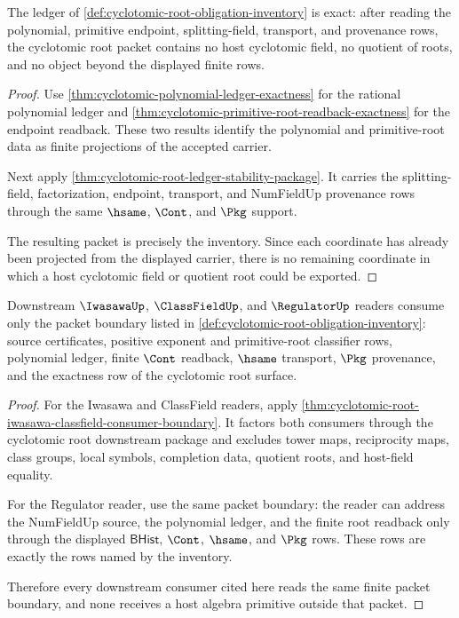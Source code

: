 \begin{theorem}
\label{thm:cyclotomic-root-ledger-exactness-obligation}
The ledger of \autoref{def:cyclotomic-root-obligation-inventory} is exact:
after reading the polynomial, primitive endpoint, splitting-field, transport,
and provenance rows, the cyclotomic root packet contains no host cyclotomic
field, no quotient of roots, and no object beyond the displayed finite rows.
\end{theorem}
\begin{proof}
Use \autoref{thm:cyclotomic-polynomial-ledger-exactness} for the rational
polynomial ledger and
\autoref{thm:cyclotomic-primitive-root-readback-exactness} for the endpoint
readback. These two results identify the polynomial and primitive-root data as
finite projections of the accepted carrier.

Next apply \autoref{thm:cyclotomic-root-ledger-stability-package}. It carries
the splitting-field, factorization, endpoint, transport, and NumFieldUp
provenance rows through the same $\hsame$, $\Cont$, and $\Pkg$ support.

The resulting packet is precisely the inventory. Since each coordinate has
already been projected from the displayed carrier, there is no remaining
coordinate in which a host cyclotomic field or quotient root could be exported.
\end{proof}

\begin{theorem}
\label{thm:cyclotomic-root-downstream-consumer-obligations}
Downstream $\IwasawaUp$, $\ClassFieldUp$, and $\RegulatorUp$ readers consume
only the packet boundary listed in
\autoref{def:cyclotomic-root-obligation-inventory}: source certificates,
positive exponent and primitive-root classifier rows, polynomial ledger,
finite $\Cont$ readback, $\hsame$ transport, $\Pkg$ provenance, and the
exactness row of the cyclotomic root surface.
\end{theorem}
\begin{proof}
For the Iwasawa and ClassField readers, apply
\autoref{thm:cyclotomic-root-iwasawa-classfield-consumer-boundary}. It factors
both consumers through the cyclotomic root downstream package and excludes
tower maps, reciprocity maps, class groups, local symbols, completion data,
quotient roots, and host-field equality.

For the Regulator reader, use the same packet boundary: the reader can address
the NumFieldUp source, the polynomial ledger, and the finite root readback
only through the displayed $\mathsf{BHist}$, $\Cont$, $\hsame$, and $\Pkg$
rows. These rows are exactly the rows named by the inventory.

Therefore every downstream consumer cited here reads the same finite packet
boundary, and none receives a host algebra primitive outside that packet.
\end{proof}
